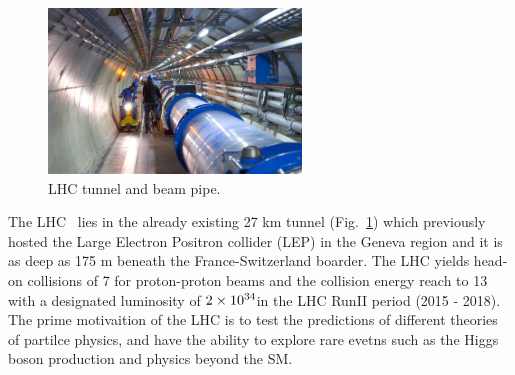 \begin{figure}[H]\centering
    \includegraphics[width=0.6\textwidth]{figure/lhc_tunnel.jpg}
    \caption{LHC tunnel and beam pipe.}
    \label{fig:lhc_tunnel}
\end{figure}
The LHC~\cite{Evans:2008zzb} lies in the already existing 27 km tunnel (Fig.~\ref{fig:lhc_tunnel}) which previously hosted the Large Electron Positron collider (LEP) in the Geneva region and it is as deep as 175 m  beneath the France-Switzerland boarder.
The LHC yields head-on collisions of 7 \TeV for proton-proton beams and the collision energy reach to 13 \TeV with a designated luminosity of $2 \times \text{10}^\text{34}$\percms in the LHC RunII period (2015 - 2018).
The prime motivaition of the LHC is to test the predictions of different theories of partilce physics, and have the ability to explore rare evetns such as the Higgs boson production and physics beyond the SM. 

